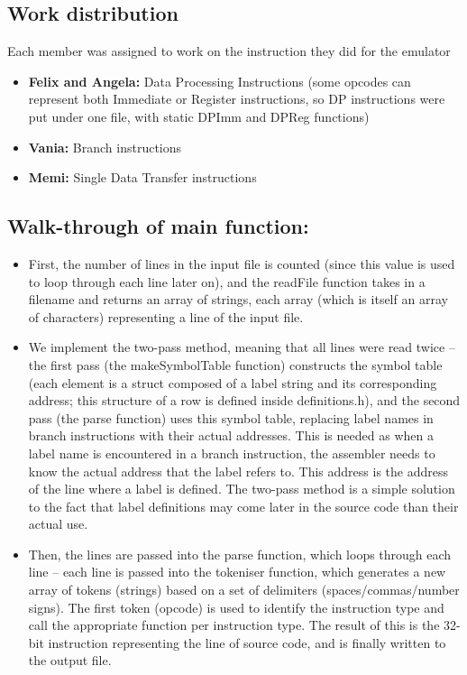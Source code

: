 \documentclass{article}
\begin{document}

\subsection{Work distribution}

Each member was assigned to work on the instruction they did for the emulator

\begin{itemize}

\item \textbf{Felix and Angela:} Data Processing Instructions (some opcodes can represent both Immediate or Register instructions, so DP instructions were put under one file, with static DPImm and DPReg functions) 

\item \textbf{Vania:} Branch instructions 

\item \textbf{Memi:} Single Data Transfer instructions
  
\end{itemize}
     
\subsection{Walk-through of main function: }

\begin{itemize}
    \item   First, the number of lines in the input file is counted (since this value is used to loop through each line later on), and the readFile function takes in a filename and returns an array of strings, each array (which is itself an array of characters) representing a line of the input file. 
    \item   We implement the two-pass method, meaning that all lines were read twice – the first pass (the makeSymbolTable function) constructs the symbol table (each element is a struct composed of a label string and its corresponding address; this structure of a row is defined inside definitions.h), and the second pass (the parse function) uses this symbol table, replacing label names in branch instructions with their actual addresses. This is needed as when a label name is encountered in a branch instruction, the assembler needs to know the actual address that the label refers to. This address is the address of the line where a label is defined. The two-pass method is a simple solution to the fact that label definitions may come later in the source code than their actual use. 
    \item     Then, the lines are passed into the parse function, which loops through each line – each line is passed into the tokeniser function, which generates a new array of tokens (strings) based on a set of delimiters (spaces/commas/number signs). The first token (opcode) is used to identify the instruction type and call the appropriate function per instruction type. The result of this is the 32-bit instruction representing the line of source code, and is finally written to the output file. 
\end{itemize} 
\end{document}
